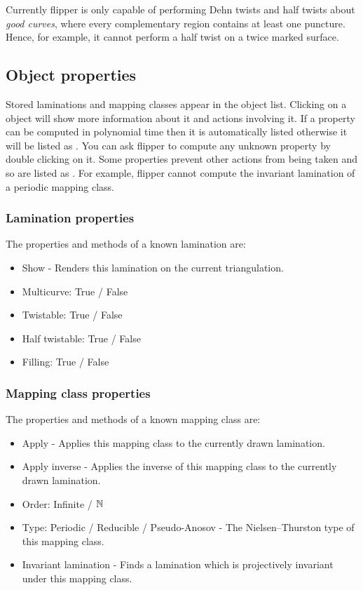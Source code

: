 \documentclass[a4paper]{article}
\newcommand{\exc}[1]{\mbox{\PVerb{#1}}}
\begin{document}
\begin{remark*}
Currently flipper is only capable of performing Dehn twists and half twists about \emph{good curves}, where every complementary region contains at least one puncture. Hence, for example, it cannot perform a half twist on a twice marked surface.
\end{remark*}

\subsection{Object properties}

Stored laminations and mapping classes appear in the object list. Clicking on a object will show more information about it and actions involving it. If a property can be computed in polynomial time then it is automatically listed otherwise it will be listed as \exc{?}. You can ask flipper to compute any unknown property by double clicking on it. Some properties prevent other actions from being taken and so are listed as \exc{x}. For example, flipper cannot compute the invariant lamination of a periodic mapping class.

\subsubsection{Lamination properties}

The properties and methods of a known lamination are:
\begin{itemize}
\item Show - Renders this lamination on the current triangulation.
\item Multicurve: True / False
\item Twistable: True / False
\item Half twistable: True / False
\item Filling: True / False
\end{itemize}

\subsubsection{Mapping class properties}

The properties and methods of a known mapping class are:
\begin{itemize}
\item Apply - Applies this mapping class to the currently drawn lamination.
\item Apply inverse - Applies the inverse of this mapping class to the currently drawn lamination.
\item Order: Infinite / $\mathbb{N}$
\item Type: Periodic / Reducible / Pseudo-Anosov - The Nielsen--Thurston type of this mapping class.
\item Invariant lamination - Finds a lamination which is projectively invariant under this mapping class.
\end{itemize}






\end{document}
